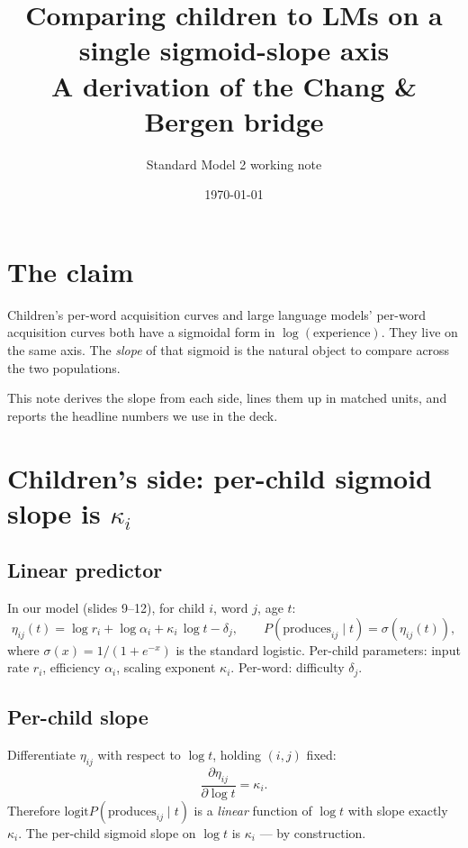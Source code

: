 \documentclass[11pt]{article}
\title{Comparing children to LMs on a single sigmoid-slope axis\\
\large{A derivation of the Chang \& Bergen bridge}}
\author{Standard Model 2 working note}
\date{\today}
\newcommand{\logit}{\mathrm{logit}}
\begin{document}
\maketitle

\section{The claim}

Children's per-word acquisition curves and large language models'
per-word acquisition curves both have a sigmoidal form in
$\log(\text{experience})$. They live on the same axis. The
\emph{slope} of that sigmoid is the natural object to compare
across the two populations.

This note derives the slope from each side, lines them up in matched
units, and reports the headline numbers we use in the deck.

\section{Children's side: per-child sigmoid slope is $\kappa_i$}

\subsection{Linear predictor}

In our model (slides 9--12), for child $i$, word $j$, age $t$:
\begin{equation}
\eta_{ij}(t) = \log r_i + \log\alpha_i + \kappa_i\,\log t - \delta_j,
\qquad
P(\text{produces}_{ij} \mid t) = \sigma(\eta_{ij}(t)),
\label{eq:our-model}
\end{equation}
where $\sigma(x) = 1/(1+e^{-x})$ is the standard logistic.
Per-child parameters: input rate $r_i$, efficiency $\alpha_i$,
scaling exponent $\kappa_i$. Per-word: difficulty $\delta_j$.

\subsection{Per-child slope}

Differentiate $\eta_{ij}$ with respect to $\log t$, holding
$(i, j)$ fixed:
\begin{equation}
\frac{\partial \eta_{ij}}{\partial \log t} = \kappa_i.
\label{eq:per-child-slope}
\end{equation}
Therefore $\logit P(\text{produces}_{ij}\mid t)$ is a
\emph{linear} function of $\log t$ with slope exactly $\kappa_i$.
The per-child sigmoid slope on $\log t$ is $\kappa_i$ --- by
construction.
\end{document}
